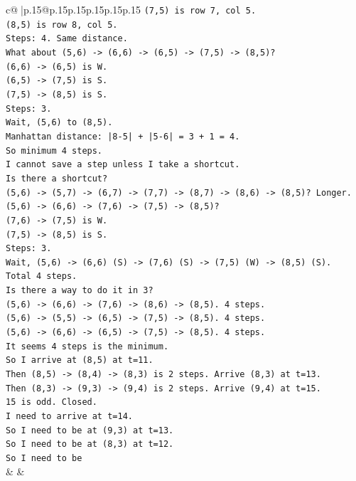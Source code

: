 \documentclass{article}
\begin{document}
{\begin{supertabular}{c@{$\;$}|p{.15\linewidth}@{}p{.15\linewidth}p{.15\linewidth}p{.15\linewidth}p{.15\linewidth}p{.15\linewidth}}
{{{\texttt{(7,5) is row 7, col 5.} \\
\texttt{(8,5) is row 8, col 5.} \\
\texttt{Steps: 4. Same distance.} \\
\texttt{What about (5,6) {-}> (6,6) {-}> (6,5) {-}> (7,5) {-}> (8,5)?} \\
\texttt{(6,6) {-}> (6,5) is W.} \\
\texttt{(6,5) {-}> (7,5) is S.} \\
\texttt{(7,5) {-}> (8,5) is S.} \\
\texttt{Steps: 3.} \\
\texttt{Wait, (5,6) to (8,5).} \\
\texttt{Manhattan distance: |8{-}5| + |5{-}6| = 3 + 1 = 4.} \\
\texttt{So minimum 4 steps.} \\
\texttt{I cannot save a step unless I take a shortcut.} \\
\texttt{Is there a shortcut?} \\
\texttt{(5,6) {-}> (5,7) {-}> (6,7) {-}> (7,7) {-}> (8,7) {-}> (8,6) {-}> (8,5)? Longer.} \\
\texttt{(5,6) {-}> (6,6) {-}> (7,6) {-}> (7,5) {-}> (8,5)?} \\
\texttt{(7,6) {-}> (7,5) is W.} \\
\texttt{(7,5) {-}> (8,5) is S.} \\
\texttt{Steps: 3.} \\
\texttt{Wait, (5,6) {-}> (6,6) (S) {-}> (7,6) (S) {-}> (7,5) (W) {-}> (8,5) (S).} \\
\texttt{Total 4 steps.} \\
\texttt{Is there a way to do it in 3?} \\
\texttt{(5,6) {-}> (6,6) {-}> (7,6) {-}> (8,6) {-}> (8,5). 4 steps.} \\
\texttt{(5,6) {-}> (5,5) {-}> (6,5) {-}> (7,5) {-}> (8,5). 4 steps.} \\
\texttt{(5,6) {-}> (6,6) {-}> (6,5) {-}> (7,5) {-}> (8,5). 4 steps.} \\
\texttt{It seems 4 steps is the minimum.} \\
\texttt{So I arrive at (8,5) at t=11.} \\
\texttt{Then (8,5) {-}> (8,4) {-}> (8,3) is 2 steps. Arrive (8,3) at t=13.} \\
\texttt{Then (8,3) {-}> (9,3) {-}> (9,4) is 2 steps. Arrive (9,4) at t=15.} \\
\texttt{15 is odd. Closed.} \\
\texttt{I need to arrive at t=14.} \\
\texttt{So I need to be at (9,3) at t=13.} \\
\texttt{So I need to be at (8,3) at t=12.} \\
\texttt{So I need to be} \\
            }
        }
    }
    & & \\ \\


\end{supertabular}}
\end{document}
